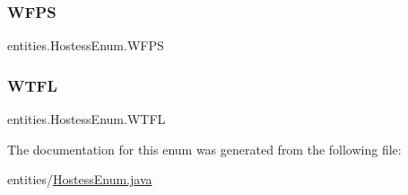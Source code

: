 \subsubsection{\texorpdfstring{W\+F\+PS}{WFPS}}
{\footnotesize\ttfamily entities.\+Hostess\+Enum.\+W\+F\+PS}

\mbox{\label{enumentities_1_1_hostess_enum_a01812c97c05d14294edfd377744a1b0d}} 
\subsubsection{\texorpdfstring{W\+T\+FL}{WTFL}}
{\footnotesize\ttfamily entities.\+Hostess\+Enum.\+W\+T\+FL}



The documentation for this enum was generated from the following file\+:\begin{DoxyCompactItemize}
\item 
entities/\hyperlink{_hostess_enum_8java}{Hostess\+Enum.\+java}\end{DoxyCompactItemize}
